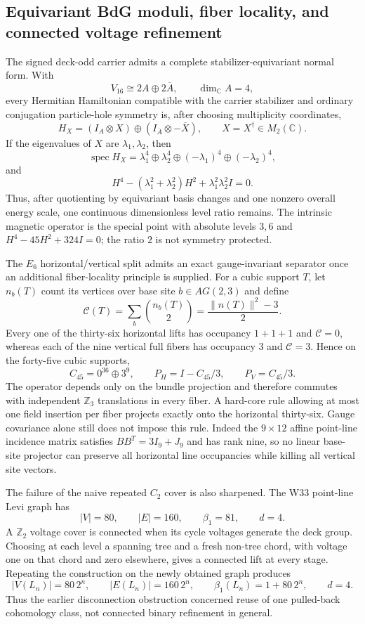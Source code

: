 \subsection{Equivariant BdG moduli, fiber locality, and connected voltage refinement}

The signed deck-odd carrier admits a complete stabilizer-equivariant normal form.
With
\[
V_{16}\cong2A\oplus2\overline A,
\qquad \dim_{\mathbb C}A=4,
\]
every Hermitian Hamiltonian compatible with the carrier stabilizer and ordinary
conjugation particle-hole symmetry is, after choosing multiplicity coordinates,
\[
\boxed{
H_X=(I_A\otimes X)\oplus(I_{\overline A}\otimes-\overline X),
\qquad X=X^\dagger\in M_2(\mathbb C).
}
\]
If the eigenvalues of $X$ are $\lambda_1,\lambda_2$, then
\[
\operatorname{spec}H_X=
\lambda_1^4\oplus\lambda_2^4\oplus(-\lambda_1)^4\oplus(-\lambda_2)^4,
\]
and
\[
H^4-(\lambda_1^2+\lambda_2^2)H^2+\lambda_1^2\lambda_2^2I=0.
\]
Thus, after quotienting by equivariant basis changes and one nonzero overall
energy scale, one continuous dimensionless level ratio remains.  The intrinsic
magnetic operator is the special point with absolute levels $3,6$ and
$H^4-45H^2+324I=0$; the ratio $2$ is not symmetry protected.

The $E_6$ horizontal/vertical split admits an exact gauge-invariant separator once
an additional fiber-locality principle is supplied.  For a cubic support $T$, let
$n_b(T)$ count its vertices over base site $b\in AG(2,3)$ and define
\[
\mathcal C(T)=\sum_b\binom{n_b(T)}2
=\frac{\|n(T)\|^2-3}{2}.
\]
Every one of the thirty-six horizontal lifts has occupancy $1+1+1$ and
$\mathcal C=0$, whereas each of the nine vertical full fibers has occupancy $3$
and $\mathcal C=3$.  Hence on the forty-five cubic supports,
\[
\boxed{
C_{45}=0^{36}\oplus3^9,
\qquad P_H=I-C_{45}/3,
\qquad P_V=C_{45}/3.
}
\]
The operator depends only on the bundle projection and therefore commutes with
independent $\mathbb Z_3$ translations in every fiber.  A hard-core rule allowing
at most one field insertion per fiber projects exactly onto the horizontal
thirty-six.  Gauge covariance alone still does not impose this rule.  Indeed the
$9\times12$ affine point-line incidence matrix satisfies
$BB^T=3I_9+J_9$ and has rank nine, so no linear base-site projector can preserve
all horizontal line occupancies while killing all vertical site vectors.

The failure of the naive repeated $C_2$ cover is also sharpened.  The W33
point-line Levi graph has
\[
|V|=80,\qquad |E|=160,\qquad \beta_1=81,\qquad d=4.
\]
A $\mathbb Z_2$ voltage cover is connected when its cycle voltages generate the
deck group.  Choosing at each level a spanning tree and a fresh non-tree chord,
with voltage one on that chord and zero elsewhere, gives a connected lift at every
stage.  Repeating the construction on the newly obtained graph produces
\[
\boxed{
|V(L_n)|=80\,2^n,\qquad
|E(L_n)|=160\,2^n,\qquad
\beta_1(L_n)=1+80\,2^n,\qquad d=4.
}
\]
Thus the earlier disconnection obstruction concerned reuse of one pulled-back
cohomology class, not connected binary refinement in general.

